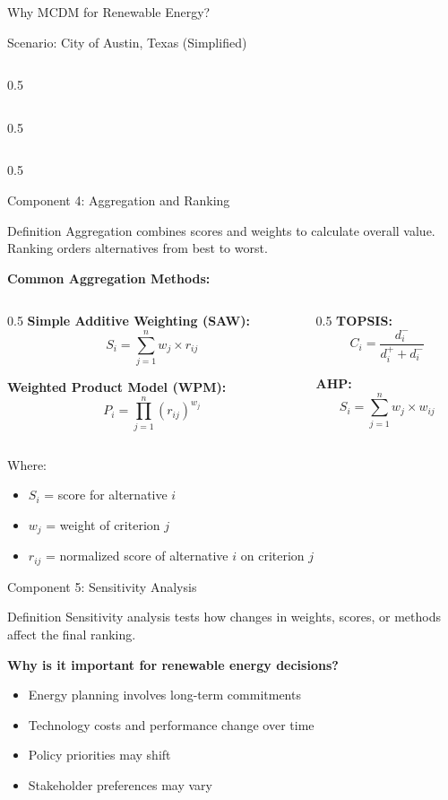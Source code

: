 \documentclass[aspectratio=169]{beamer}
\begin{document}
\begin{frame}{Why MCDM for Renewable Energy?}
\begin{center}
\begin{block}{Scenario: City of Austin, Texas (Simplified)}
\begin{column}{0.5\textwidth}
\begin{itemize}
\begin{column}{0.5\textwidth}
\begin{itemize}
\begin{columns}
\begin{column}{0.5\textwidth}
\begin{center}
\begin{frame}{Component 4: Aggregation and Ranking}
\begin{block}{Definition}
Aggregation combines scores and weights to calculate overall value. Ranking orders alternatives from best to worst.
\end{block}

\textbf{Common Aggregation Methods:}

\begin{columns}
\begin{column}{0.5\textwidth}
\textbf{Simple Additive Weighting (SAW):}
$$S_i = \sum_{j=1}^{n} w_j \times r_{ij}$$

\textbf{Weighted Product Model (WPM):}
$$P_i = \prod_{j=1}^{n} (r_{ij})^{w_j}$$
\end{column}
\begin{column}{0.5\textwidth}
\textbf{TOPSIS:}
$$C_i = \frac{d_i^-}{d_i^+ + d_i^-}$$

\textbf{AHP:}
$$S_i = \sum_{j=1}^{n} w_j \times w_{ij}$$
\end{column}
\end{columns}

\vspace{0.3cm}
Where:
\begin{itemize}
\item $S_i$ = score for alternative $i$
\item $w_j$ = weight of criterion $j$
\item $r_{ij}$ = normalized score of alternative $i$ on criterion $j$
\end{itemize}
\end{frame}

\begin{frame}{Component 5: Sensitivity Analysis}
\begin{block}{Definition}
Sensitivity analysis tests how changes in weights, scores, or methods affect the final ranking.
\end{block}

\textbf{Why is it important for renewable energy decisions?}
\begin{itemize}
\item Energy planning involves long-term commitments
\item Technology costs and performance change over time
\item Policy priorities may shift
\item Stakeholder preferences may vary
\end{itemize}


\end{frame}
\end{center}
\end{column}
\end{columns}
\end{itemize}
\end{column}
\end{itemize}
\end{column}
\end{block}
\end{center}
\end{frame}
\end{document}
